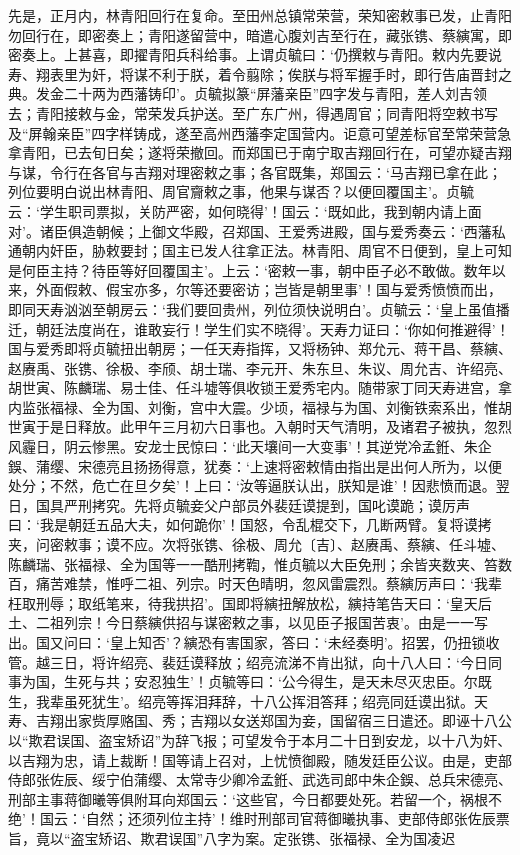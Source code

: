 \documentclass[]{article}
\begin{document}
先是，正月内，林青阳回行在复命。至田州总镇常荣营，荣知密敕事已发，止青阳勿回行在，即密奏上；青阳遂留营中，暗遣心腹刘吉至行在，藏张镌、蔡縯寓，即密奏上。上甚喜，即擢青阳兵科给事。上谓贞毓曰：`仍撰敕与青阳。敕内先要说寿、翔表里为奸，将谋不利于朕，着令翦除；俟朕与将军握手时，即行告庙晋封之典。发金二十两为西藩铸印'。贞毓拟篆``屏藩亲臣''四字发与青阳，差人刘吉领去；青阳接敕与金，常荣发兵护送。至广东广州，得遇周官；同青阳将空敕书写及``屏翰亲臣''四字样铸成，遂至高州西藩李定国营内。讵意可望差标官至常荣营急拿青阳，已去旬日矣；遂将荣撤回。而郑国已于南宁取吉翔回行在，可望亦疑吉翔与谋，令行在各官与吉翔对理密敕之事；各官既集，郑国云：`马吉翔已拿在此；列位要明白说出林青阳、周官齎敕之事，他果与谋否？以便回覆国主'。贞毓云：`学生职司票拟，关防严密，如何晓得'！国云：`既如此，我到朝内请上面对'。诸臣俱造朝候；上御文华殿，召郑国、王爱秀进殿，国与爱秀奏云：`西藩私通朝内奸臣，胁敕要封；国主已发人往拿正法。林青阳、周官不日便到，皇上可知是何臣主持？待臣等好回覆国主'。上云：`密敕一事，朝中臣子必不敢做。数年以来，外面假敕、假宝亦多，尔等还要密访；岂皆是朝里事'！国与爱秀愤愤而出，即同天寿汹汹至朝房云：`我们要回贵州，列位须快说明白'。贞毓云：`皇上虽值播迁，朝廷法度尚在，谁敢妄行！学生们实不晓得'。天寿力证曰：`你如何推避得'！国与爱秀即将贞毓扭出朝房；一任天寿指挥，又将杨钟、郑允元、蒋干昌、蔡縯、赵赓禹、张镌、徐极、李颀、胡士瑞、李元开、朱东旦、朱议、周允吉、许绍亮、胡世寅、陈麟瑞、易士佳、任斗墟等俱收锁王爱秀宅内。随带家丁同天寿进宫，拿内监张福禄、全为国、刘衡，宫中大震。少顷，福禄与为国、刘衡铁索系出，惟胡世寅于是日释放。此甲午三月初六日事也。入朝时天气清明，及诸君子被执，忽烈风霾日，阴云惨黑。安龙士民惊曰：`此天壤间一大变事'！其逆党冷孟銋、朱企鋘、蒲缨、宋德亮且扬扬得意，犹奏：`上速将密敕情由指出是出何人所为，以便处分；不然，危亡在旦夕矣'！上曰：`汝等逼朕认出，朕知是谁'！因悲愤而退。翌日，国具严刑拷究。先将贞毓妾父户部员外裴廷谟提到，国叱谟跪；谟厉声曰：`我是朝廷五品大夫，如何跪你'！国怒，令乱棍交下，几断两臂。复将谟拷夹，问密敕事；谟不应。次将张镌、徐极、周允〔吉〕、赵赓禹、蔡縯、任斗墟、陈麟瑞、张福禄、全为国等一一酷刑拷鞫，惟贞毓以大臣免刑；余皆夹数夹、笞数百，痛苦难禁，惟呼二祖、列宗。时天色晴明，忽风雷震烈。蔡縯厉声曰：`我辈枉取刑辱；取纸笔来，待我拱招'。国即将縯扭解放松，縯持笔告天曰：`皇天后土、二祖列宗！今日蔡縯供招与谋密敕之事，以见臣子报国苦衷'。由是一一写出。国又问曰：`皇上知否'？縯恐有害国家，答曰：`未经奏明'。招罢，仍扭锁收管。越三日，将许绍亮、裴廷谟释放；绍亮流涕不肯出狱，向十八人曰：`今日同事为国，生死与共；安忍独生'！贞毓等曰：`公今得生，是天未尽灭忠臣。尔既生，我辈虽死犹生'。绍亮等挥泪拜辞，十八公挥泪答拜；绍亮同廷谟出狱。天寿、吉翔出家赀厚赂国、秀；吉翔以女送郑国为妾，国留宿三日遣还。即诬十八公以``欺君误国、盗宝矫诏''为辞飞报；可望发令于本月二十日到安龙，以十八为奸、以吉翔为忠，请上裁断！国等请上召对，上忧愤御殿，随发廷臣公议。由是，吏部侍郎张佐辰、绥宁伯蒲缨、太常寺少卿冷孟銋、武选司郎中朱企鋘、总兵宋德亮、刑部主事蒋御曦等俱附耳向郑国云：`这些官，今日都要处死。若留一个，祸根不绝'！国云：`自然；还须列位主持'！维时刑部司官蒋御曦执事、吏部侍郎张佐辰票旨，竟以``盗宝矫诏、欺君误国''八字为案。定张镌、张福禄、全为国凌迟
\end{document}
